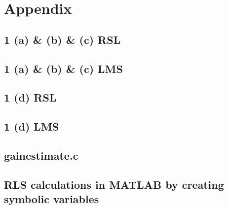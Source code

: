 \documentclass{article}
\begin{document}

\newpage
\section*{Appendix}

\subsection*{1 (a) \& (b) \& (c) RSL}


\subsection*{1 (a) \& (b) \& (c) LMS}


\subsection*{1 (d) RSL}


\subsection*{1 (d) LMS}


\subsection*{gainestimate.c}


\subsection*{RLS calculations in MATLAB by creating symbolic variables}
\label{rls_syms}

\end{document}
